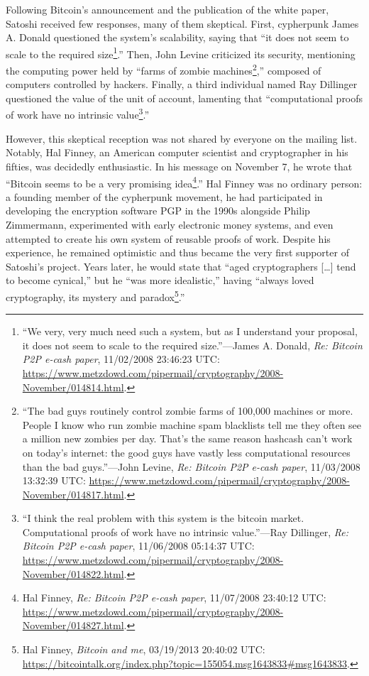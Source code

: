 \documentclass[
  a5paper,
  smalldemyvopaper,10pt,twoside,onecolumn,openright,extrafontsizes,hidelinks]{memoir}
\begin{document}
Following Bitcoin's announcement and the publication of the white paper,
Satoshi received few responses, many of them skeptical. First,
cypherpunk James A. Donald questioned the system's scalability, saying
that ``it does not seem to scale to the required size\footnote{``We
  very, very much need such a system, but as I understand your proposal,
  it does not seem to scale to the required size.''---James A. Donald,
  \emph{Re: Bitcoin P2P e-cash paper}, 11/02/2008 23:46:23 UTC:
  \url{https://www.metzdowd.com/pipermail/cryptography/2008-November/014814.html}.}.''
Then, John Levine criticized its security, mentioning the computing
power held by ``farms of zombie machines\footnote{``The bad guys
  routinely control zombie farms of 100,000 machines or more. People I
  know who run zombie machine spam blacklists tell me they often see a
  million new zombies per day. That's the same reason hashcash can't
  work on today's internet: the good guys have vastly less computational
  resources than the bad guys.''---John Levine, \emph{Re: Bitcoin P2P
  e-cash paper}, 11/03/2008 13:32:39 UTC:
  \url{https://www.metzdowd.com/pipermail/cryptography/2008-November/014817.html}.},''
composed of computers controlled by hackers. Finally, a third individual
named Ray Dillinger questioned the value of the unit of account,
lamenting that ``computational proofs of work have no intrinsic
value\footnote{``I think the real problem with this system is the
  bitcoin market. Computational proofs of work have no intrinsic
  value.''---Ray Dillinger, \emph{Re: Bitcoin P2P e-cash paper},
  11/06/2008 05:14:37 UTC:
  \url{https://www.metzdowd.com/pipermail/cryptography/2008-November/014822.html}.}.''

However, this skeptical reception was not shared by everyone on the
mailing list. Notably, Hal Finney, an American computer scientist and
cryptographer in his fifties, was decidedly enthusiastic. In his message
on November 7, he wrote that ``Bitcoin seems to be a very promising
idea\footnote{Hal Finney, \emph{Re: Bitcoin P2P e-cash paper},
  11/07/2008 23:40:12 UTC:
  \url{https://www.metzdowd.com/pipermail/cryptography/2008-November/014827.html}.}.''
Hal Finney was no ordinary person: a founding member of the cypherpunk
movement, he had participated in developing the encryption software PGP
in the 1990s alongside Philip Zimmermann, experimented with early
electronic money systems, and even attempted to create his own system of
reusable proofs of work. Despite his experience, he remained optimistic
and thus became the very first supporter of Satoshi's project. Years
later, he would state that ``aged cryptographers {[}\ldots{]} tend to
become cynical,'' but he ``was more idealistic,'' having ``always loved
cryptography, its mystery and paradox\footnote{Hal Finney, \emph{Bitcoin
  and me}, 03/19/2013 20:40:02 UTC:
  \url{https://bitcointalk.org/index.php?topic=155054.msg1643833\#msg1643833}.}.''
\end{document}
